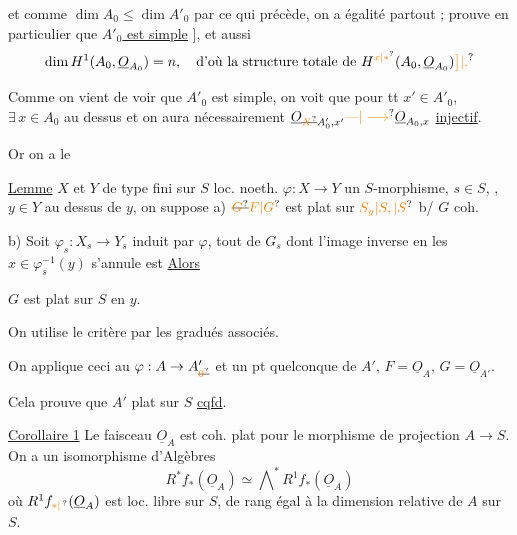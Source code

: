 et comme $\dim A_0\leq\dim A'_0$ par ce qui précède, on a égalité partout ;  prouve en particulier que \uline{$A'_0$ est simple} ], et aussi
\[
\dim H^{1}(A_0,\underline O_{A_0})=n,\quad\text{d'où la structure totale de }H^{\unsure{x|*}}(A_0,\underline O_{A_0})\unsure{\big]|.}
\]

Comme on vient de voir que $A'_0$ est simple, on voit que pour tt $x'\in A'_0$, $\exists\,x\in A_0$ au dessus et on aura nécessairement $\underline O_{\deleted{\unsure{X}}A'_0,x'}\unsure{\text{---}|\longrightarrow}\underline O_{A_0,x}$ \uline{injectif}.

Or on a le

\uline{Lemme} $X$ et $Y$ de type fini sur $S$ loc. noeth.  $\varphi:X\to Y$ un $S$-morphisme, $s\in S$, ,  $y\in Y$ au dessus de $y$, on suppose a) $\deleted{\unsure{G}} \unsure{F|G}$ est plat sur $\unsure{S_y|S,|S}$ b/ $G$ coh.


b) Soit $\varphi_s:X_s\to Y_s$ induit par $\varphi$,  tout  de $G_s$ dont l'image inverse en les $x\in\varphi_s^{-1}(y)$ s'annule est   \uline{Alors}

$G$ est plat sur $S$ en $y$.

On utilise le critère par les gradués associés.

On applique ceci au $\varphi:A\to A_{\deleted{\unsure{0}}}'$ et un pt quelconque de $A'$, $F=\underline O_A$, $G=\underline O_{A'}$.

Cela prouve que $A'$  plat sur $S$ \uline{cqfd}.

\noindent\llap{\smash{\rule[-1.8\baselineskip]{0.4pt}{1.7\baselineskip}}\quad}\uline{Corollaire 1}  Le faisceau $\underline O_A$ est coh. plat pour le  morphisme de projection $A\to S$.  On a un isomorphisme d'Algèbres
\[
R^{*}f_*(\underline O_A)\simeq\bigwedge\nolimits^{*} R^{1}f_*(\underline O_A)
\]
\noindent\llap{\smash{\rule[-1.2\baselineskip]{0.4pt}{1.5\baselineskip}}\quad}où $R^1f_{\unsure{*|\,}}(\underline O_A)$ est loc. libre sur $S$, de rang égal à la dimension relative de $A$ sur $S$.

